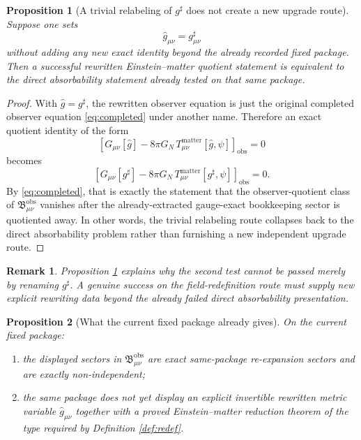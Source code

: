 \documentclass[11pt]{article}
\newcommand{\CompletedMetric}{g^{\sharp}}
\newcommand{\RedefMetric}{\widehat g}
\newcommand{\ObsBurden}{\mathfrak B_{\mu\nu}^{\mathrm{obs}}}
\newcommand{\ObserverClass}[1]{\left[#1\right]_{\mathrm{obs}}}
\newtheorem{proposition}{Proposition}
\newtheorem{remark}{Remark}
\begin{document}
\begin{proposition}[A trivial relabeling of \texorpdfstring{\(\CompletedMetric\)}{g-sharp} does not create a new upgrade route]
\label{prop:trivial}
Suppose one sets
\[
\RedefMetric_{\mu\nu}=\CompletedMetric_{\mu\nu}
\]
without adding any new exact identity beyond the already recorded fixed package. Then a successful rewritten Einstein--matter quotient statement is equivalent to the direct absorbability statement already tested on that same package.
\end{proposition}

\begin{proof}
With \(\RedefMetric=\CompletedMetric\), the rewritten observer equation is just the original completed observer equation \eqref{eq:completed} under another name. Therefore an exact quotient identity of the form
\[
\ObserverClass{G_{\mu\nu}[\RedefMetric]-8\pi G_N\,T_{\mu\nu}^{\mathrm{matter}}[\RedefMetric,\psi]}=0
\]
becomes
\[
\ObserverClass{G_{\mu\nu}[\CompletedMetric]-8\pi G_N\,T_{\mu\nu}^{\mathrm{matter}}[\CompletedMetric,\psi]}=0.
\]
By \eqref{eq:completed}, that is exactly the statement that the observer-quotient class of \(\ObsBurden\) vanishes after the already-extracted gauge-exact bookkeeping sector is quotiented away. In other words, the trivial relabeling route collapses back to the direct absorbability problem rather than furnishing a new independent upgrade route.
\end{proof}

\begin{remark}
Proposition \ref{prop:trivial} explains why the second test cannot be passed merely by renaming \(g^\sharp\). A genuine success on the field-redefinition route must supply new explicit rewriting data beyond the already failed direct absorbability presentation.
\end{remark}

\begin{proposition}[What the current fixed package already gives]
\label{prop:current}
On the current fixed package:
\begin{enumerate}
    \item the displayed sectors in \(\ObsBurden\) are exact same-package re-expansion sectors and are exactly non-independent;
    \item the same package does not yet display an explicit invertible rewritten metric variable \(\RedefMetric_{\mu\nu}\) together with a proved Einstein--matter reduction theorem of the type required by Definition \ref{def:redef}.
\end{enumerate}
\end{proposition}
\end{document}
